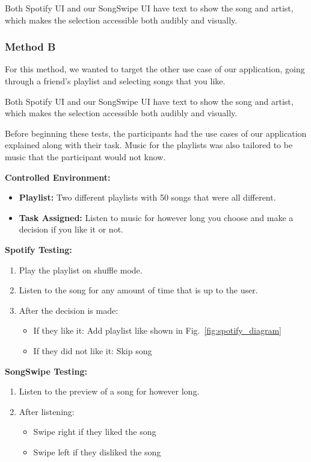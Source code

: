 \documentclass{article}
\begin{document}
    Both Spotify UI and our SongSwipe UI have text to show the song and artist, which makes the selection accessible both audibly and visually.

\subsubsection*{Method B}

For this method, we wanted to target the other use case of our application, going through a friend's playlist and selecting songs that you like.

Both Spotify UI and our SongSwipe UI have text to show the song and artist, which makes the selection accessible both audibly and visually.
    
Before beginning these tests, the participants had the use cases of our application explained along with their task. Music for the playlists was also tailored to be music that the participant would not know.

    \textbf{Controlled Environment:}
    
    \begin{itemize}
    \item \textbf{Playlist:} Two different playlists with 50 songs that were all different.
    \item \textbf{Task Assigned:} Listen to music for however long you choose and make a decision if you like it or not.
    \end{itemize}

    \textbf{Spotify Testing:} 
    
    \begin{enumerate}
        \item Play the playlist on shuffle mode.
        \item Listen to the song for any amount of time that is up to the user.
        \item After the decision is made:
            \begin{itemize}
                \item If they like it: Add playlist like shown in Fig.~\ref{fig:spotify_diagram}
                \item If they did not like it: Skip song
            \end{itemize}
    \end{enumerate}

    \textbf{SongSwipe Testing:}
    
    \begin{enumerate}
        \item Listen to the preview of a song for however long.
        \item After listening:
            \begin{itemize}
                \item Swipe right if they liked the song
                \item Swipe left if they disliked the song
            \end{itemize}
    \end{enumerate}
\end{document}
